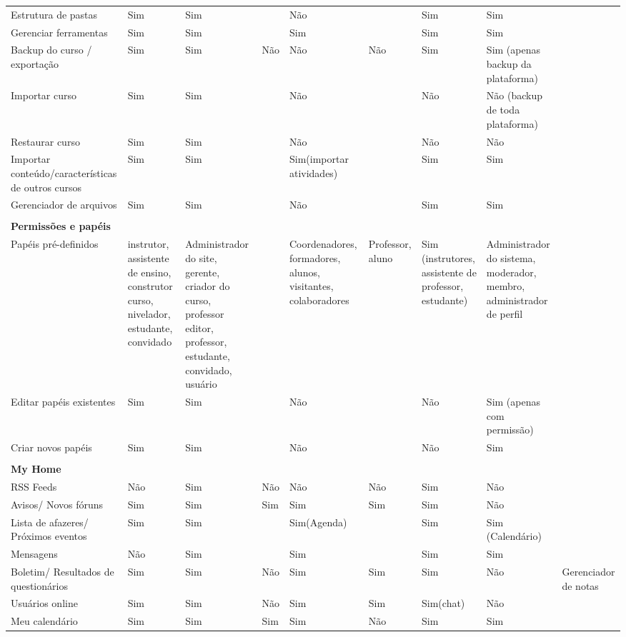 \begin{table}[!htb]
\begin{tabular}{@{}p{5cm}|p{4cm}|p{4cm}|p{4cm}|p{4cm}|p{4cm}|p{4cm}|p{4cm}|p{4cm}@{}}
Estrutura de pastas & Sim & Sim &  & Não &  & Sim & Sim &  \\
Gerenciar ferramentas & Sim & Sim &  & Sim &  & Sim & Sim &  \\
Backup do curso / exportação & Sim & Sim & Não & Não & Não & Sim & Sim (apenas backup da plataforma) &  \\
Importar curso & Sim & Sim &  & Não &  & Não & Não (backup de toda plataforma) &  \\
Restaurar curso & Sim & Sim &  & Não &  & Não & Não &  \\
Importar conteúdo/características de outros cursos & Sim & Sim &  & Sim(importar atividades) &  & Sim & Sim &  \\
Gerenciador de arquivos & Sim & Sim &  & Não &  & Sim & Sim &  \\
 &  &  &  &  &  &  &  &  \\
\textbf{Permissões e papéis} &  &  &  &  &  &  &  &  \\
Papéis pré-definidos & instrutor, assistente de ensino, construtor curso, nivelador, estudante, convidado & Administrador do site, gerente, criador do curso, professor editor, professor, estudante, convidado, usuário &  & Coordenadores, formadores, alunos, visitantes, colaboradores & Professor, aluno & Sim (instrutores, assistente de professor, estudante) & Administrador do sistema, moderador, membro, administrador de perfil &  \\
Editar papéis existentes & Sim & Sim &  & Não &  & Não & Sim (apenas com permissão) &  \\
Criar novos papéis & Sim & Sim &  & Não &  & Não & Sim &  \\
 &  &  &  &  &  &  &  &  \\
\textbf{My Home} &  &  &  &  &  &  &  &  \\
RSS Feeds & Não & Sim & Não & Não & Não & Sim & Não &  \\
Avisos/ Novos fóruns & Sim & Sim & Sim & Sim & Sim & Sim & Não &  \\
Lista de afazeres/ Próximos eventos & Sim & Sim &  & Sim(Agenda) &  & Sim & Sim (Calendário) &  \\
Mensagens & Não & Sim &  & Sim &  & Sim & Sim &  \\
Boletim/ Resultados de questionários & Sim & Sim & Não & Sim & Sim & Sim & Não & Gerenciador de notas \\
Usuários online & Sim & Sim & Não & Sim & Sim & Sim(chat) & Não &  \\
Meu calendário & Sim & Sim & Sim & Sim & Não & Sim & Sim &  \\

\end{tabular}
\end{table}
